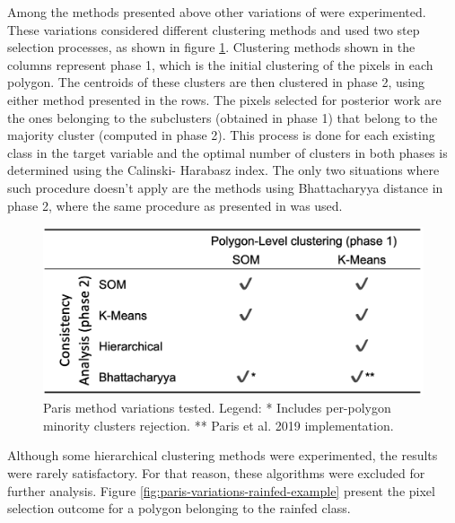 \documentclass[12pt, english, openany]{book}
\begin{document}
Among the methods presented above other variations of \cite{Paris2019} were
experimented. These variations considered different clustering methods and used
two step selection processes, as shown in figure \ref{fig:paris-variations}.
Clustering methods shown in the columns represent phase 1, which is the initial
clustering of the pixels in each polygon. The centroids of these clusters are
then clustered in phase 2, using either method presented in the rows. The
pixels selected for posterior work are the ones belonging to the subclusters
(obtained in phase 1) that belong to the majority cluster (computed in phase
2). This process is done for each existing class in the target variable and the
optimal number of clusters in both phases is determined using the Calinski-
Harabasz index. The only two situations where such procedure doesn't apply are
the methods using Bhattacharyya distance in phase 2, where the same procedure
as presented in \cite{Paris2019} was used.

\begin{figure}[H]
	\centering
	\includegraphics[width=.7\linewidth]{paris_variations.png}
  \caption[Paris method variations tested.]{Paris method variations tested.
  Legend: * Includes per-polygon minority clusters rejection. ** Paris et al.
  2019 implementation.}
  \label{fig:paris-variations}
\end{figure}

Although some hierarchical clustering methods were experimented, the results
were rarely satisfactory. For that reason, these algorithms were excluded for
further analysis. Figure \ref{fig:paris-variations-rainfed-example} present the pixel selection outcome for a polygon belonging to the rainfed class.
\end{document}

